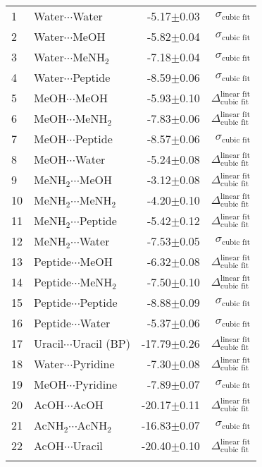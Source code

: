 \begin{longtable}{llrr}
1 & Water$\cdots$Water & -5.17$\pm$0.03 & $\sigma_\text{cubic fit}$ \\
2 & Water$\cdots$MeOH & -5.82$\pm$0.04 & $\sigma_\text{cubic fit}$ \\
3 & Water$\cdots$MeNH$_2$ & -7.18$\pm$0.04 & $\sigma_\text{cubic fit}$ \\
4 & Water$\cdots$Peptide & -8.59$\pm$0.06 & $\sigma_\text{cubic fit}$ \\
5 & MeOH$\cdots$MeOH & -5.93$\pm$0.10 & $\Delta_\text{cubic fit}^\text{linear fit}$ \\
6 & MeOH$\cdots$MeNH$_2$ & -7.83$\pm$0.06 & $\Delta_\text{cubic fit}^\text{linear fit}$ \\
7 & MeOH$\cdots$Peptide & -8.57$\pm$0.06 & $\sigma_\text{cubic fit}$ \\
8 & MeOH$\cdots$Water & -5.24$\pm$0.08 & $\Delta_\text{cubic fit}^\text{linear fit}$ \\
9 & MeNH$_2$$\cdots$MeOH & -3.12$\pm$0.08 & $\Delta_\text{cubic fit}^\text{linear fit}$ \\
10 & MeNH$_2$$\cdots$MeNH$_2$ & -4.20$\pm$0.10 & $\Delta_\text{cubic fit}^\text{linear fit}$ \\
11 & MeNH$_2$$\cdots$Peptide & -5.42$\pm$0.12 & $\Delta_\text{cubic fit}^\text{linear fit}$ \\
12 & MeNH$_2$$\cdots$Water & -7.53$\pm$0.05 & $\sigma_\text{cubic fit}$ \\
13 & Peptide$\cdots$MeOH & -6.32$\pm$0.08 & $\Delta_\text{cubic fit}^\text{linear fit}$ \\
14 & Peptide$\cdots$MeNH$_2$ & -7.50$\pm$0.10 & $\Delta_\text{cubic fit}^\text{linear fit}$ \\
15 & Peptide$\cdots$Peptide & -8.88$\pm$0.09 & $\sigma_\text{cubic fit}$ \\
16 & Peptide$\cdots$Water & -5.37$\pm$0.06 & $\sigma_\text{cubic fit}$ \\
17 & Uracil$\cdots$Uracil (BP) & -17.79$\pm$0.26 & $\Delta_\text{cubic fit}^\text{linear fit}$ \\
18 & Water$\cdots$Pyridine & -7.30$\pm$0.08 & $\Delta_\text{cubic fit}^\text{linear fit}$ \\
19 & MeOH$\cdots$Pyridine & -7.89$\pm$0.07 & $\sigma_\text{cubic fit}$ \\
20 & AcOH$\cdots$AcOH & -20.17$\pm$0.11 & $\Delta_\text{cubic fit}^\text{linear fit}$ \\
21 & AcNH$_2$$\cdots$AcNH$_2$ & -16.83$\pm$0.07 & $\sigma_\text{cubic fit}$ \\
22 & AcOH$\cdots$Uracil & -20.40$\pm$0.10 & $\Delta_\text{cubic fit}^\text{linear fit}$ \\
$$
\end{longtable}
